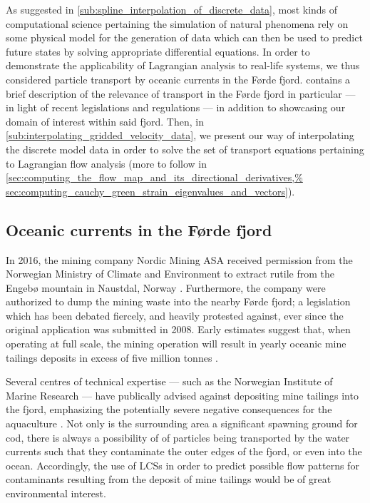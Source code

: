 As suggested in \cref{sub:spline_interpolation_of_discrete_data}, most kinds of
computational science pertaining the simulation of natural phenomena rely on
some physical model for the generation of data which can then be used to
predict future states by solving appropriate differential equations. In order
to demonstrate the applicability of Lagrangian analysis to real-life systems,
we thus considered particle transport by oceanic currents in the Førde fjord.
 contains a brief description of
the relevance of transport in the Førde fjord in particular --- in light of
recent legislations and regulations --- in addition to showcasing our domain of
interest within said fjord. Then, in
\cref{sub:interpolating_gridded_velocity_data}, we present our way of
interpolating the discrete model data in order to solve the set of transport
equations pertaining to Lagrangian flow analysis (more to follow in
\cref{sec:computing_the_flow_map_and_its_directional_derivatives,%
sec:computing_cauchy_green_strain_eigenvalues_and_vectors}).

\subsection{Oceanic currents in the Førde fjord}
\label{sub:oceanic_currents_in_the_forde_fjord}

In 2016, the mining company Nordic Mining ASA received permission from the
Norwegian Ministry of Climate and Environment to extract rutile from the
Engebø mountain in Naustdal, Norway \parencite{garvik2017gruvekonflikten,%
haugan2015sjodeponi}. Furthermore, the company were authorized to dump
the mining waste into the nearby Førde fjord; a legislation which has been
debated fiercely, and heavily protested against, ever since the original
application was submitted in 2008. Early estimates suggest that, when operating
at full scale, the mining operation will result in yearly oceanic mine tailings
deposits in excess of five million tonnes \parencite{garvik2017gruvekonflikten}.

Several centres of technical expertise --- such as the Norwegian Institute of
Marine Research --- have publically advised against depositing mine tailings
into the fjord, emphasizing the potentially severe negative consequences
for the aquaculture \parencite{haugan2015sjodeponi}. Not only is the surrounding
area a significant spawning ground for cod, there is always a possibility of
of particles being transported by the water currents such that they
contaminate the outer edges of the fjord, or even into the ocean. Accordingly,
the use of LCSs in order to predict possible flow patterns for contaminants
resulting from the deposit of mine tailings would be of great environmental
interest.

